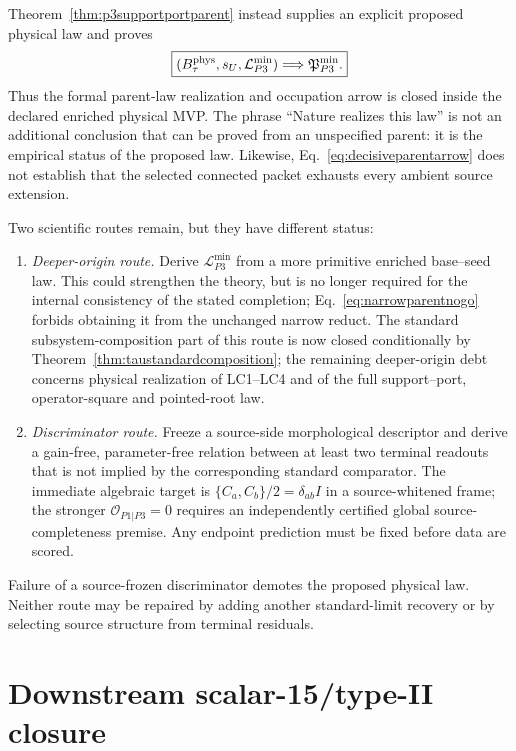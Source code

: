 \documentclass[11pt]{article}
\begin{document}
Theorem~\ref{thm:p3supportportparent} instead supplies an explicit proposed
physical law and proves
\begin{equation}
 \boxed{
 (B_\tau^{\rm phys},s_U,\mathcal L_{P3}^{\min})
 \Longrightarrow \mathfrak P_{P3}^{\min}.
 }
 \label{eq:decisiveparentarrow}
\end{equation}
Thus the formal parent-law realization and occupation arrow is closed inside
the declared enriched physical MVP.  The phrase ``Nature realizes this law''
is not an additional conclusion that can be proved from an unspecified
parent: it is the empirical status of the proposed law.  Likewise,
Eq.~\eqref{eq:decisiveparentarrow} does not establish that the selected
connected packet exhausts every ambient source extension.

Two scientific routes remain, but they have different status:
\begin{enumerate}
\item \emph{Deeper-origin route.}  Derive
  $\mathcal L_{P3}^{\min}$ from a more primitive enriched base--seed law.  This
  could strengthen the theory, but is no longer required for the internal
  consistency of the stated completion; Eq.~\eqref{eq:narrowparentnogo}
  forbids obtaining it from the unchanged narrow reduct.  The standard
  subsystem-composition part of this route is now closed conditionally by
  Theorem~\ref{thm:taustandardcomposition}; the remaining deeper-origin debt
  concerns physical realization of LC1--LC4 and of the full support--port,
  operator-square and pointed-root law.
\item \emph{Discriminator route.}  Freeze a source-side morphological
  descriptor and derive a gain-free, parameter-free relation between at least
  two terminal readouts that is not implied by the corresponding standard
  comparator.  The immediate algebraic target is
  $\{C_a,C_b\}/2=\delta_{ab}I$ in a source-whitened frame; the stronger
  $\mathcal O_{P1|P3}=0$ requires an independently certified global
  source-completeness premise.  Any endpoint prediction must be fixed before
  data are scored.
\end{enumerate}
Failure of a source-frozen discriminator demotes the proposed physical law.
Neither route may be repaired by adding another standard-limit recovery or by
selecting source structure from terminal residuals.

\section{Downstream scalar-15/type-II closure}
\label{sec:scalar15handoff}
\end{document}
